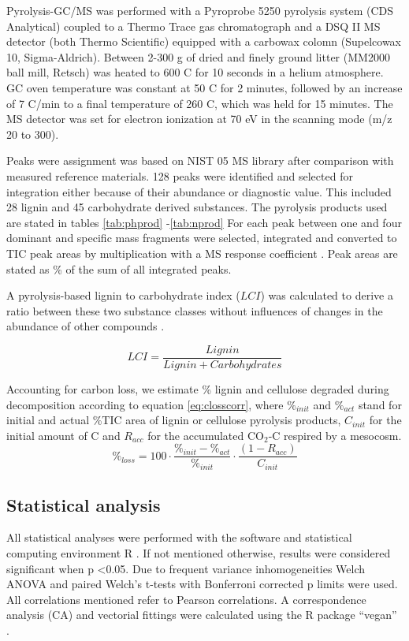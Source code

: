 Pyrolysis-GC/MS was performed with a Pyroprobe 5250 pyrolysis system (CDS Analytical) coupled to a Thermo Trace gas chromatograph and a DSQ II MS detector (both Thermo Scientific) equipped with a carbowax colomn (Supelcowax 10, Sigma-Aldrich). Between 2-300 \textmu g of dried and finely ground litter (MM2000 ball mill, Retsch) was heated to 600 \textdegree C for 10 seconds in a helium atmosphere. GC oven temperature was constant at 50 \textdegree C for 2 minutes, followed by an increase of 7 \textdegree C/min to a final temperature of 260 \textdegree C, which was held for 15 minutes. The MS detector was set for electron ionization at 70 eV in the scanning mode (m/z 20 to 300).

Peaks were assignment was based on NIST 05 MS library after comparison with measured reference materials. 128 peaks were identified and selected for integration either because of their abundance or diagnostic value. This included 28 lignin and 45 carbohydrate derived substances. The pyrolysis products used are stated in tables \ref{tab:phprod} -\ref{tab:nprod} For each peak between one and four dominant and specific mass fragments were selected, integrated and converted to TIC peak areas by multiplication with a MS response coefficient \cite{Schellekens2009, Kuder1998}. Peak areas are stated as \% of the sum of all integrated peaks.

A pyrolysis-based lignin to carbohydrate index ($LCI$) was calculated to derive a ratio between these two substance classes without influences of changes in the abundance of other compounds . 

\begin{equation}
 LCI=\frac{Lignin}{Lignin + Carbohydrates}
\end{equation}

Accounting for carbon loss, we estimate \% lignin and cellulose degraded during decomposition according to equation \ref{eq:closscorr}, where \emph{$\%_{init}$} and \emph{$\%_{act}$} stand for initial and actual \%TIC area of lignin or cellulose pyrolysis products, \emph{$C_{init}$} for the initial amount of C and \emph{$R_{acc}$} for the accumulated CO$_2$-C respired by a mesocosm.
\begin{equation}
 \%_{loss} = 100\cdot\frac{\%_{init}-\%_{act}}{\%_{init}}\cdot\frac{\left ( 1-R_{acc}\right ) }{C_{init}}
 \label{eq:closscorr}
\end{equation}



\subsection*{Statistical analysis}
All statistical analyses were performed with the software and statistical computing environment R \cite{R}. If not mentioned otherwise, results were considered significant when p \textless 0.05. Due to frequent variance inhomogeneities Welch ANOVA and paired Welch's t-tests with Bonferroni corrected p limits were used. All correlations mentioned refer to Pearson correlations. A correspondence analysis (CA) and vectorial fittings were calculated using the R package ``vegan'' \cite{vegan}.

